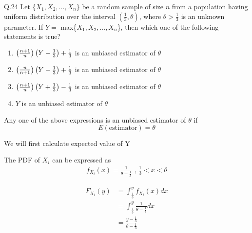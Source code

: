 \documentclass{article}[]
\begin{document}
	\newcommand*{\permcomb}[4][0mu]{{{}^{#3}\mkern#1#2_{#4}}}
\newcommand*{\perm}[1][-3mu]{\permcomb[#1]{P}}
\newcommand*{\comb}[1][-1mu]{\permcomb[#1]{C}}
\providecommand{\qfunc}[1]{\ensuremath{Q\left(#1\right)}}
\providecommand{\gauss}[2]{\mathcal{N}\ensuremath{\left(#1,#2\right)}}
\providecommand{\diff}[2]{\ensuremath{\frac{d{#1}}{d{#2}}}}
\providecommand{\myceil}[1]{\left \lceil #1 \right \rceil }
\newcommand\figref{Fig.~\ref}
\newcommand\tabref{Table~\ref}
\newcommand{\sinc}{\,\text{sinc}\,}
\newcommand{\rect}{\,\text{rect}\,}

\let\vec\mathbf

Q.24 Let $\{X_1, X_2,...,X_n\}$ be a random sample of size $n$ from a population having uniform distribution over the interval $\left(\frac{1}{3},\theta \right)$, where $\theta>\frac{1}{3}$ is an unknown parameter. If $Y = $ max\{$X_1, X_2,...,X_n$\}, then which one of the following statements is true?
\begin{enumerate}
\item $\begin{pmatrix}\frac{n+1}{n}\end{pmatrix}\begin{pmatrix}Y-\frac{1}{3}\end{pmatrix} + \frac{1}{3}$ is an unbiased estimator of $\theta$
\item $\begin{pmatrix}\frac{n}{n+1}\end{pmatrix}\begin{pmatrix}Y-\frac{1}{3}\end{pmatrix} + \frac{1}{3}$ is an unbiased estimator of $\theta$
\item $\begin{pmatrix}\frac{n+1}{n}\end{pmatrix}\begin{pmatrix}Y+\frac{1}{3}\end{pmatrix} - \frac{1}{3}$ is an unbiased estimator of $\theta$
\item $Y$ is an unbiased estimator of $\theta$
\end{enumerate} 

\solution

Any one of the above expressions is an unbiased estimator of $\theta$ if 
$$E(\text{estimator})=\theta$$

We will first calculate expected value of Y

The PDF of $X_i$ can be expressed as
\begin{align}
f_{X_i}(x)=\frac{1}{\theta-\frac{1}{3}} \text{ , }  \frac{1}{3}<x<\theta
\end{align}

\begin{align}
F_{X_i}(y)&=\int_{\frac{1}{3}}^{y} f_{X_i}(x) dx \\
&=\int_{\frac{1}{3}}^{y} \frac{1}{\theta-\frac{1}{3}} dx \\
&=\frac{y-\frac{1}{3}}{\theta-\frac{1}{3}}
\end{align}
\end{document}
